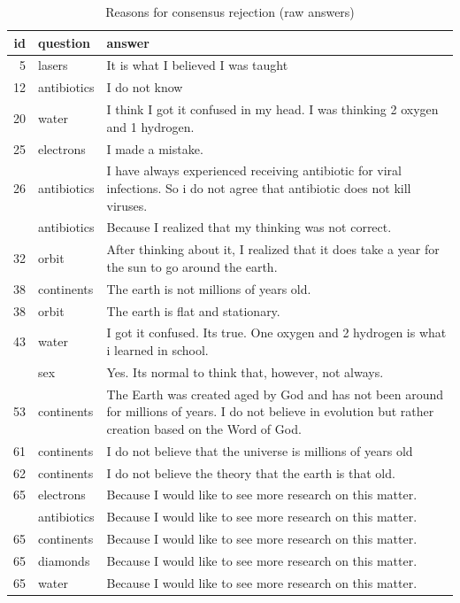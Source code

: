 \documentclass[
  doc,floatsintext]{apa6}
\begin{document}
\begin{longtable}[t]{>{}r>{}l>{\raggedright\arraybackslash}p{30em}}
\caption{\label{tab:exp3-reasons-rejection}Reasons for consensus rejection (raw answers)}\\
\toprule
id & question & answer\\
\midrule
5 & lasers & It is what I believed I was taught\\
12 & antibiotics & I do not know\\
20 & water & I think I got it confused in my head. I was thinking 2 oxygen and 1 hydrogen.\\
25 & electrons & I made a mistake.\\
26 & antibiotics & I have always experienced receiving antibiotic for viral infections. So i do not agree that antibiotic does not kill viruses.\\
\addlinespace
32 & antibiotics & Because I realized that my thinking was not correct.\\
32 & orbit & After thinking about it, I realized  that it does take a year for the sun to go around the earth.\\
38 & continents & The earth is not millions of years old.\\
38 & orbit & The earth is flat and stationary.\\
43 & water & I got it confused. Its true. One oxygen and  2 hydrogen is what i learned in school.\\
\addlinespace
46 & sex & Yes.  Its normal to think that, however, not always.\\
53 & continents & The Earth was created aged by God and has not been around for millions of years. I do not believe in evolution but rather creation based on the Word of God.\\
61 & continents & I do not believe that the universe is millions of years old\\
62 & continents & I do not believe the theory that the earth is that old.\\
65 & electrons & Because I would like to see more research on this matter.\\
\addlinespace
65 & antibiotics & Because I would like to see more research on this matter.\\
65 & continents & Because I would like to see more research on this matter.\\
65 & diamonds & Because I would like to see more research on this matter.\\
65 & water & Because I would like to see more research on this matter.\\

\end{longtable}
\end{document}

